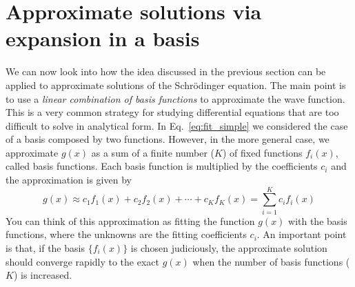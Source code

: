 \documentclass[../Main/notes.tex]{subfiles}
\begin{document}
\section{Approximate solutions via expansion in a basis}
We can now look into how the idea discussed in the previous section can be applied to approximate solutions of the Schr\"{o}dinger equation.
The main point is to use a \emph{linear combination of basis functions} to approximate the wave function.
This is a very common strategy for studying differential equations that are too difficult to solve in analytical form.
In Eq.~\eqref{eq:fit_simple} we considered the case of a basis composed by two functions.
However, in the more general case, we approximate $g(x)$ as a sum of a finite number ($K$) of fixed functions $f_i(x)$, called basis functions.
Each basis function is multiplied by the coefficients $c_i$ and the approximation is given by
\begin{equation}
g(x) \approx  c_1 f_1(x) +  c_2 f_2(x) + \cdots + c_K f_K(x) = \sum_{i=1}^{K} c_i f_i(x) 
\end{equation}
You can think of this approximation as fitting the function $g(x)$ with the basis functions, where the unknowns are the fitting coefficients $c_i$.
An important point is that, if the basis $\{ f_i(x) \}$ is chosen judiciously, the approximate solution should converge rapidly to the exact $g(x)$ when the number of basis functions ($K$) is increased.
\end{document}
